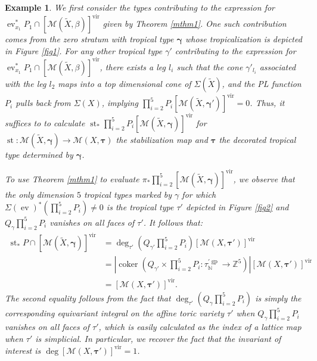 \documentclass[12pt, oneside]{amsart}   	%
\newcounter{thm}
\newtheorem{example}[thm]{Example}
\newcommand{\NN}{\mathbb{N}}
\newcommand{\vir}{\operatorname{vir}}
\newcommand{\ev}{\operatorname{ev}}
\newcommand{\gp}{\operatorname{gp}}
\newcommand{\st}{\operatorname{st}}
\newcommand{\coker}{\operatorname{coker}}
\numberwithin{equation}{section}
\numberwithin{thm}{section}
\numberwithin{figure}{section}
\begin{document}
\begin{example}
We first consider the types contributing to the expression for $\ev_{x_1}^*P_1\cap [\mathscr{M}(\widetilde{X},\beta)]^{\vir}$ given by Theorem \ref{mthm1}. One such contribution comes from the zero stratum with tropical type $\pmb\gamma$ whose tropicalization is depicted in Figure \ref{fig1}. For any other tropical type $\gamma'$ contributing to the expression for $\ev_{x_1}^*P_1\cap[\mathscr{M}(\widetilde{X},\beta)]^{\vir}$, there exists a leg $l_i$ such that the cone $\gamma'_{l_i}$ associated with the leg $l_2$ maps into a top dimensional cone of $\Sigma(\widetilde{X})$, and the PL function $P_i$ pulls back from $\Sigma(X)$, implying $\prod_{i=2}^5P_i [\mathscr{M}(\widetilde{X},\pmb\gamma')]^{\vir} = 0$. Thus, it suffices to to calculate $\st_*\prod_{i=2}^5P_i[\mathscr{M}(\widetilde{X},\pmb\gamma)]^{\vir}$ for $\st: \mathscr{M}(\widetilde{X},\pmb\gamma) \rightarrow \mathscr{M}(X,\pmb\tau)$ the stabilization map and $\pmb\tau$ the decorated tropical type determined by $\pmb\gamma$.

 To use Theorem \ref{mthm1} to evaluate $\pi_*\prod_{i=2}^5[\mathscr{M}(\widetilde{X},\pmb\gamma)]^{\vir}$, we observe that the only dimension $5$ tropical types marked by $\gamma$ for which $\Sigma(\ev)^*(\prod_{i=2}^5 P_i) \not= 0$ is the tropical type $\tau'$ depicted in Figure \ref{fig2} and $Q_{\gamma}\prod_{i=2}^5 P_i$ vanishes on all faces of $\tau'$. It follows that:
\begin{equation}
\begin{split}
\st_*P\cap [\mathscr{M}(\widetilde{X},\pmb\gamma)]^{\vir} &= \deg_{\tau'}(Q_{\gamma'}\prod_{i=2}^5 P_i)[\mathscr{M}(X,\pmb\tau')]^{\vir} \\
&= |\coker(Q_{\gamma'}\times \prod_{i=2}^5 P_i: \tau^{'\gp}_{\NN} \rightarrow \mathbb{Z}^5)|[\mathscr{M}(X,\pmb\tau')]^{\vir} \\
&= [\mathscr{M}(X,\pmb\tau')]^{\vir}.
\end{split}
\end{equation}
The second equality follows from the fact that $\deg_{\tau'}(Q_{\gamma}\prod_{i=2}^5P_i)$ is simply the corresponding equivariant integral on the affine toric variety $\tau'$ when $Q_{\gamma}\prod_{i=2}^5P_i$ vanishes on all faces of $\tau'$, which is easily calculated as the index of a lattice map when $\tau'$ is simplicial. In particular, we recover the fact that the invariant of interest is $\deg[\mathscr{M}(X,\pmb\tau')]^{\vir} = 1$.





\end{example}
\end{document}
